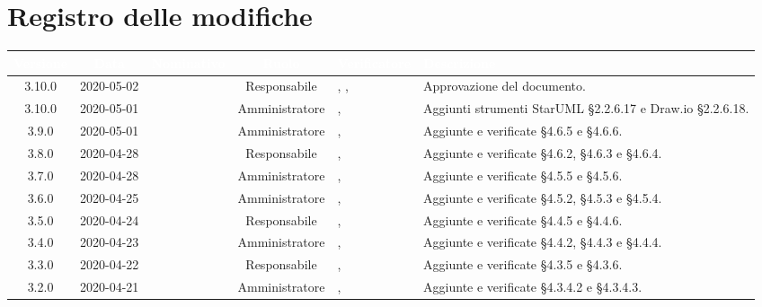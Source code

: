 \section*{Registro delle modifiche}
{
\renewcommand{\arraystretch}{1.5}
\centering
\begin{longtable}{ c c  C{2.3cm} c C{3cm} C{3.2cm}}
\textcolor{white}{\textbf{Versione}}&
\textcolor{white}{\textbf{Data}}&
\textcolor{white}{\textbf{Nominativo}}&
\textcolor{white}{\textbf{Ruolo}}&
\textcolor{white}{\textbf{Verificatore}}&
\textcolor{white}{\textbf{Descrizione}}\\	
\endhead

3.10.0 & 2020-05-02 & \DF{} & Responsabile & \AT{}, \PF{}, \MC{} &  Approvazione del documento. \\

3.10.0 & 2020-05-01 & \MC{} & Amministratore &  \AT{}, \PF{} & Aggiunti strumenti StarUML §2.2.6.17 e Draw.io §2.2.6.18. \\

3.9.0 & 2020-05-01 & \BR{} & Amministratore &  \AT{}, \PF{} & Aggiunte e verificate §4.6.5 e §4.6.6.  \\

3.8.0 & 2020-04-28 & \LD{} & Responsabile &  \AT{}, \PF{} & Aggiunte e verificate §4.6.2, §4.6.3 e §4.6.4.  \\

3.7.0 & 2020-04-28 & \SE{} & Amministratore &  \AT{}, \PF{} & Aggiunte e verificate §4.5.5 e §4.5.6.  \\

3.6.0 & 2020-04-25 & \BR{} & Amministratore &  \AT{}, \PF{} & Aggiunte e verificate §4.5.2, §4.5.3 e §4.5.4.  \\

3.5.0 & 2020-04-24 & \LD{} & Responsabile &  \AT{}, \PF{} & Aggiunte e verificate §4.4.5 e §4.4.6.  \\

3.4.0 & 2020-04-23 & \BR{} & Amministratore &  \AT{}, \PF{} & Aggiunte e verificate §4.4.2, §4.4.3 e §4.4.4.  \\

3.3.0 & 2020-04-22 & \LD{} & Responsabile &  \AT{}, \PF{} & Aggiunte e verificate §4.3.5 e §4.3.6.  \\

3.2.0 & 2020-04-21 & \SE{} & Amministratore &  \AT{}, \PF{} & Aggiunte e verificate §4.3.4.2 e §4.3.4.3.  \\


\end{longtable}}
